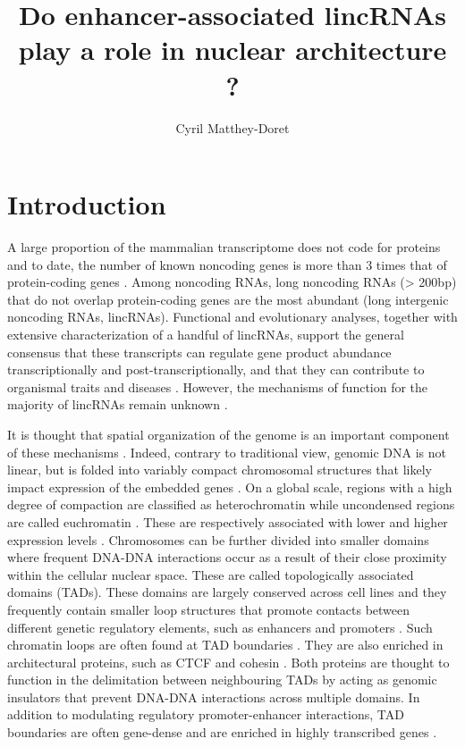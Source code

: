 \documentclass[10pt,a4paper]{report}
\author{Cyril Matthey-Doret}
\title{Do enhancer-associated lincRNAs play a role in nuclear architecture ?}
\begin{document}
\maketitle
\section*{Introduction}
A large proportion of the mammalian transcriptome does not code for proteins and to date, the number of known noncoding genes is more than 3 times that of protein-coding genes \cite{Iyer2015}⁠. Among noncoding RNAs, long noncoding RNAs (> 200bp) that do not overlap protein-coding genes are the most abundant (long intergenic noncoding RNAs, lincRNAs). Functional and evolutionary analyses, together with extensive characterization of a handful of lincRNAs, support the general consensus that these transcripts can regulate gene product abundance transcriptionally and post-transcriptionally, and that they can contribute to  organismal traits and diseases \cite{Kornienko2013}⁠. However, the mechanisms of function for the majority of lincRNAs remain unknown \cite{Rinn2012}⁠.  

It is thought that spatial organization of the genome is an important component of these mechanisms \cite{Engreitz2016}⁠. Indeed, contrary to traditional view, genomic DNA is not linear, but is folded into variably compact chromosomal structures that likely impact expression of the embedded genes \cite{Gorkin2014}⁠. On a global scale, regions with a high degree of compaction are classified as heterochromatin while uncondensed regions are called euchromatin \cite{Passarge1979}⁠. These are respectively associated with lower and higher expression levels \cite{Tamaru2010}⁠. Chromosomes can be further divided into smaller domains where frequent DNA-DNA interactions occur as a result of their close proximity within the cellular nuclear space. These are called topologically associated domains (TADs). These domains are largely conserved across cell lines and they frequently contain smaller loop structures that promote contacts between different genetic regulatory elements, such as enhancers and promoters \cite{Rao2014}⁠. Such chromatin loops are often found at TAD boundaries \cite{Rao2014}⁠. They are also enriched in architectural proteins, such as CTCF and cohesin \cite{Pope2014}⁠. Both proteins are thought to function in the delimitation between neighbouring TADs by acting as genomic insulators that prevent DNA-DNA interactions across multiple domains. In addition to modulating regulatory promoter-enhancer interactions, TAD boundaries are often gene-dense and are enriched in  highly transcribed genes \cite{Ong2014}⁠. 
\end{document}
